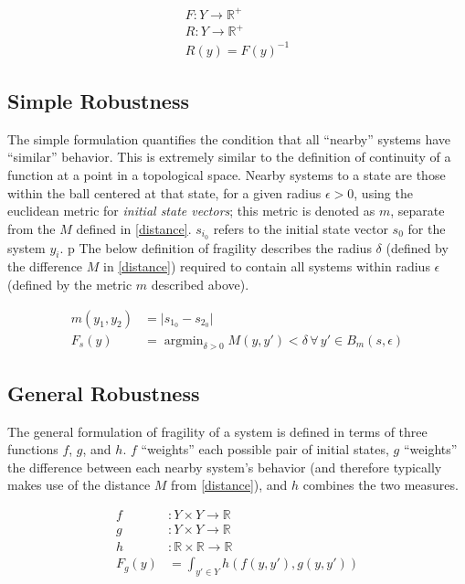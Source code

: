 \documentclass{article}
\DeclareMathOperator*{\argmin}{argmin}
\begin{document}
\begin{align}
  F : Y \to \mathbb{R}^+ \\
  R : Y \to \mathbb{R}^+ \\
  R(y) = F(y)^{-1}
\end{align}

\subsection{Simple Robustness}
The simple formulation quantifies the condition that all ``nearby'' systems have ``similar'' behavior. This is extremely similar to the definition of continuity of a function at a point in a topological space. Nearby systems to a state are those within the ball centered at that state, for a given radius $\epsilon > 0$, using the euclidean metric for \textit{initial state vectors}; this metric is denoted as $m$, separate from the $M$ defined in \eqref{distance}. $s_{i_0}$ refers to the initial state vector $s_0$ for the system $y_i$.
p
The below definition of fragility describes the radius $\delta$ (defined by the difference $M$ in \eqref{distance}) required to contain all systems within radius $\epsilon$ (defined by the metric $m$ described above).

\begin{align}
  m(y_1, y_2) &= \lvert s_{1_0} - s_{2_0} \rvert \label{example-metric} \\
  F_s(y) &= \argmin_{\delta > 0} M(y, y') < \delta \,\forall\, y' \in B_m(s, \epsilon)
\end{align}

\subsection{General Robustness} \label{general-robustness}
The general formulation of fragility of a system is defined in terms of three functions $f$, $g$, and $h$. $f$ ``weights'' each possible pair of initial states, $g$ ``weights'' the difference between each nearby system's behavior (and therefore typically makes use of the distance $M$ from \eqref{distance}), and $h$ combines the two measures.

\begin{align}
  f &: Y \times Y \to \mathbb{R} \\
  g &: Y \times Y \to \mathbb{R} \\
  h &: \mathbb{R} \times \mathbb{R} \to \mathbb{R} \\
  F_g(y) &= \int_{y' \in Y} h(f(y, y'), g(y, y')) \label{general-fragility}
\end{align}
\end{document}
